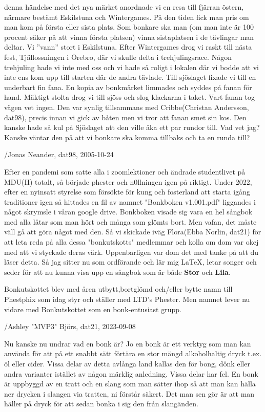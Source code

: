 denna händelse med det nya märket anordnade vi en resa till fjärran östern, närmare bestämt Eskilstuna och Wintergames. På den tiden fick man pris om man kom på första eller sista plats. Som bonkare ska man (om man inte är 100 procent säker på att vinna första platsen) vinna sistaplatsen i de tävlingar man deltar. Vi ”vann” stort i Eskilstuna. Efter Wintergames drog vi raskt till nästa fest, Tjällossningen i Örebro, där vi skulle delta i trehjulingsrace. Någon trehjuling hade vi inte med oss och vi hade så roligt i lokalen där vi bodde att vi inte ens kom upp till starten där de andra tävlade. Till sjöslaget fixade vi till en underbart fin fana. En kopia av bonkmärket limmades och syddes på fanan för hand. Mäktigt stolta drog vi till sjöss och slog klackarna i taket. Vart fanan tog vägen vet ingen. Den var synlig tillsammans med Cribbe(Christan Andersson, dat98), precis innan vi gick av båten men vi tror att fanan smet sin kos. Den kanske hade så kul på Sjöslaget att den ville åka ett par rundor till. Vad vet jag? Kanske väntar den på att vi bonkare ska komma tillbaks och ta en runda till?

/Jonas Neander, dat98, 2005-10-24

Efter en pandemi som satte alla i zoomlektioner och ändrade studentlivet på MDU(H) totalt, så började phester och n0llningen igen på riktigt. Under 2022, efter en nyinsatt styrelse som försökte för kung och fosterland att starta igång traditioner igen så hittades en fil av namnet "Bonkboken v1.001.pdf" liggandes i något skrymsle i våran google drive. Bonkboken visade sig vara en hel sångbok med alla låtar som man hört och många som glömts bort. Men vafan, det måste väll gå att göra något med den. Så vi skickade iväg Flora(Ebba Norlin, dat21) för att leta reda på alla dessa "bonkutskotts" medlemmar och kolla om dom var okej med att vi styckade deras värk. Uppenbarligen var dom det med tanke på att du läser detta. Så jag sitter nu som ordförande och lär mig LaTeX, letar songer och seder för att nu kunna visa upp en sångbok som är både \textbf{Stor} och \textbf{Lila}.

Bonkutskottet blev med åren utbytt,bortglömd och/eller bytte namn till Phestphix som idag styr och ställer med LTD's Phester. Men namnet lever nu vidare med Bonkutskottet som en bonk-entusiast grupp.

/Ashley "MVP3" Björs, dat21, 2023-09-08\newpage


Nu kanske nu undrar vad en bonk är? Jo en bonk är ett verktyg som man kan använda för att på ett snabbt sätt förtära en stor mängd alkoholhaltig dryck t.ex. öl eller cider. Vissa delar av detta avlånga land kallas den för bong, dônk eller andra varianter istället av någon märklig anledning. Vissa delar har fel. En bonk är uppbyggd av en tratt och en slang som man sätter ihop så att man kan hälla ner drycken i slangen via tratten, ni förstår säkert. Det man sen gör är att man häller på dryck för att sedan bonka i sig den från slangänden.

